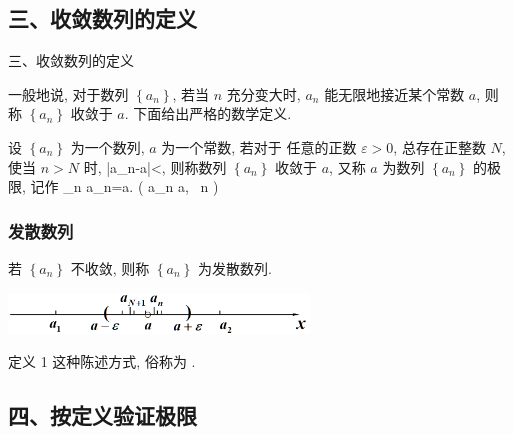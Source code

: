\documentclass[mathserif]{beamer}
\begin{document}
\subsection{三、收敛数列的定义}


\begin{frame}{  三、收敛数列的定义}%
	
	\suojin 一般地说, 对于数列 $\left\{a_n\right\}$, 若当 $n$ 充分变大时, $a_n$ 能无限地接近某个常数 $a$, 则称 $\left\{a_n\right\}$ 收敛于 $a$. 下面给出严格的数学定义.
	\begin{dfn}[1]
		\suojin 设 $\left\{a_n\right\}$ 为一个数列, $a$ 为一个常数, 若对于 任意的正数 $\varepsilon>0$, 总存在正整数 $N$, 使当 $n>N$ 时,
		\benas
		\left|a_n-a\right|<\varepsilon,
		\eenas
		则称数列 $\left\{a_n\right\}$ 收敛于 $a$, 又称 $a$ 为数列 $\left\{a_n\right\}$ 的极限, 记作
		\benas
		\lim _{n \rightarrow \infty} a_n=a. \quad  ( \quad a_n \rightarrow a,~ n \rightarrow \infty)
		\eenas
	\end{dfn} 

\end{frame}


\begin{frame}
	\frametitle{发散数列}
	\suojin 若 $\left\{a_n\right\}$ 不收敛, 则称 $\left\{a_n\right\}$ 为发散数列.
	\begin{center}
		\includegraphics[width=0.6\textwidth]{figures/shuzhoushulie1.png}
	\end{center}

	\begin{alertblock}{}
		 定义 1 这种陈述方式, 俗称为 .     
	\end{alertblock}{}
	
	
\end{frame}



\subsection{四、按定义验证极限}
\end{document}
